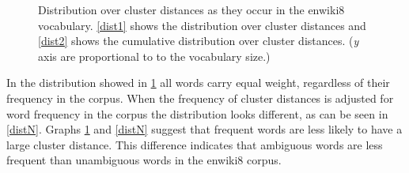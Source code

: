 \documentclass[11pt]{article}
\begin{document}
\begin{figure}
	\center
	\newline
	\caption{Distribution over cluster distances as they occur in the enwiki8 vocabulary. \ref{dist1} shows the distribution over cluster distances and \ref{dist2} shows the cumulative distribution over cluster distances. (\textit{y} axis are proportional to to the vocabulary size.)}
	\label{dist}
\end{figure}

In the distribution showed in \ref{dist} all words carry equal weight, regardless of their frequency in the corpus. When the frequency of cluster distances is adjusted for word frequency in the corpus the distribution looks different, as can be seen in \ref{distN}. Graphs \ref{dist} and \ref{distN} suggest that frequent words are less likely to have a large cluster distance. This difference indicates that ambiguous words are less frequent than unambiguous words in the enwiki8 corpus.
\end{document}

